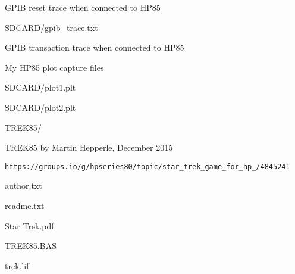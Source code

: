 \begin{DoxyItemize}
\begin{DoxyItemize}
\begin{DoxyItemize}
\item G\+P\+IB reset trace when connected to H\+P85
\end{DoxyItemize}
\item S\+D\+C\+A\+R\+D/gpib\+\_\+trace.\+txt
\begin{DoxyItemize}
\item G\+P\+IB transaction trace when connected to H\+P85
\end{DoxyItemize}
\end{DoxyItemize}
\item My H\+P85 plot capture files
\begin{DoxyItemize}
\item S\+D\+C\+A\+R\+D/plot1.\+plt
\item S\+D\+C\+A\+R\+D/plot2.\+plt
\end{DoxyItemize}
\item T\+R\+E\+K85/
\begin{DoxyItemize}
\item T\+R\+E\+K85 by Martin Hepperle, December 2015
\item \href{https://groups.io/g/hpseries80/topic/star_trek_game_for_hp_85/4845241}{\tt https\+://groups.\+io/g/hpseries80/topic/star\+\_\+trek\+\_\+game\+\_\+for\+\_\+hp\+\_/4845241}
\begin{DoxyItemize}
\item author.\+txt
\item readme.\+txt
\item Star Trek.\+pdf
\item T\+R\+E\+K85.\+B\+AS
\item trek.\+lif
\end{DoxyItemize}
\end{DoxyItemize}
\end{DoxyItemize}



 